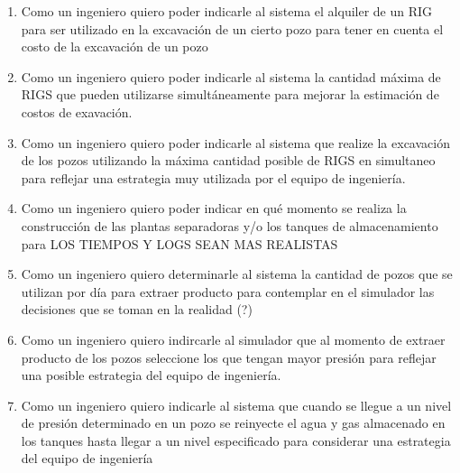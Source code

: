\begin{enumerate}
  \item Como un ingeniero quiero poder indicarle al sistema el alquiler de un RIG para ser utilizado en la excavación de un cierto pozo para tener en cuenta el costo de la excavación de un pozo
  \item Como un ingeniero quiero poder indicarle al sistema la cantidad máxima de RIGS que pueden utilizarse simultáneamente para mejorar la estimación de costos de exavación.
  \item Como un ingeniero quiero poder indicarle al sistema que realize la excavación de los pozos utilizando la máxima cantidad posible de RIGS en simultaneo para reflejar una estrategia muy utilizada por el equipo de ingeniería.
  \item Como un ingeniero quiero poder indicar en qué momento se realiza la construcción de las plantas separadoras y/o los tanques de almacenamiento para LOS TIEMPOS Y LOGS SEAN MAS REALISTAS
  \item Como un ingeniero quiero determinarle al sistema la cantidad de pozos que se utilizan por día para extraer producto para contemplar en el simulador las decisiones que se toman en la realidad (?)
  \item Como un ingeniero quiero indircarle al simulador que al momento de extraer producto de los pozos seleccione los que tengan mayor presión para reflejar una posible estrategia del equipo de ingeniería.
  \item Como un ingeniero quiero indicarle al sistema que cuando se llegue a un nivel de presión determinado en un pozo se reinyecte el agua y gas almacenado en los tanques hasta llegar a un nivel especificado para considerar una estrategia del equipo de ingeniería
\end{enumerate}
